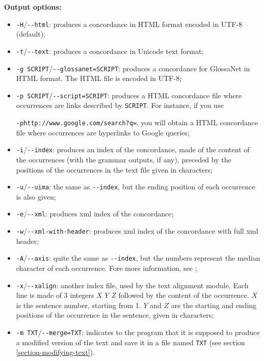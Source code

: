 \bigskip
\noindent \textbf{Output options:}
\begin{itemize}
  \item \verb+-H+/\verb+--html+: produces a concordance in HTML format encoded in
    UTF-8 (default);
  \item \verb+-t+/\verb+--text+: produces a concordance in Unicode text format; 
  \item \verb+-g SCRIPT+/\verb+--glossanet=SCRIPT+: produces a concordance for GlossaNet
  in HTML format. The HTML file is encoded in UTF-8;

  \item \verb+-p SCRIPT+/\verb+--script=SCRIPT+: produces a HTML concordance
  file where occurrences are links described by \verb+SCRIPT+. For instance, if
  you use
  
  \verb$-phttp://www.google.com/search?q=$, you will obtain
  a HTML concordance file where occurrences are hyperlinks to Google queries;

  \item \verb+-i+/\verb+--index+: produces an index of the concordance, made of the
    content of the occurrences (with the grammar outputs, if any), preceded by
    the positions of the occurrences in the text file given in characters;
  \item \verb+-u+/\verb+--uima+: the same as \verb+--index+, but the ending
  position of each occurrence is also given;
  \item \verb+-e+/\verb+--xml+: produces xml index of the concordance;
  \item \verb+-w+/\verb+--xml-with-header+: produces xml index of the concordance with full xml header;
  \item \verb+-A+/\verb+--axis+: quite the same as \verb+--index+, but the numbers
    represent the median character of each occurrence. Fore more information,
    see \cite{axis};
  \item \verb+-x+/\verb+--xalign+: another index file, used by the text alignment module.
    Each line is made of 3 integers $X$ $Y$ $Z$ followed by the content of the 
    occurrence. $X$ is the sentence number, starting from 1. $Y$ and $Z$ are the
    starting and ending positions of the occurrence in the sentence, given in
    characters;
  \item \verb+-m TXT+/\verb+--merge=TXT+: indicates to the program that it is supposed to
    produce a modified version of the text and save it in a file named
    \verb+TXT+ (see section \ref{section-modifying-text}).
\end{itemize}

